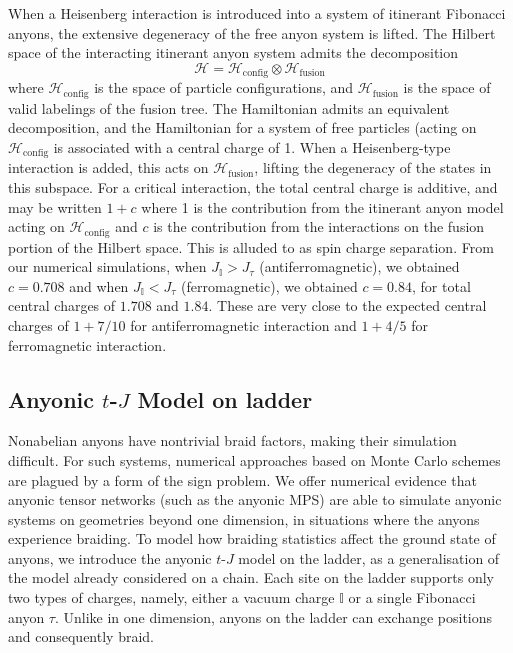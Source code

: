 \documentclass[aps,reprint,superscriptaddress,amsmath,amssymb,amsfonts,prb]{revtex4-1}
\newcommand{\mrm}[1]{\mathrm{#1}}
\newcommand{\mc}[1]{\mathcal{#1}}
\begin{document}
When a Heisenberg interaction is introduced into a system of itinerant Fibonacci anyons, the extensive degeneracy of the free anyon system is lifted. The Hilbert space of the interacting itinerant anyon system admits the decomposition
\begin{equation}
\mc{H} = \mc{H}_\mrm{config}\otimes\mc{H}_\mrm{fusion}
\end{equation}
where $\mc{H}_\mrm{config}$ is the space of particle configurations, and $\mc{H}_\mrm{fusion}$ is the space of valid labelings of the fusion tree. The Hamiltonian admits an equivalent decomposition, and the Hamiltonian for a system of free particles (acting on $\mc{H}_\mrm{config}$ is associated with 
a central charge of 1. When a Heisenberg-type interaction is added, this acts on $\mc{H}_\mrm{fusion}$, lifting the degeneracy of the states in this subspace. For a critical interaction, the total central charge is additive, and may be written $1+c$ where 1 is the contribution from the itinerant anyon model acting on $\mc{H}_\mrm{config}$ and $c$ is the contribution from the interactions on the fusion portion of the Hilbert space.\cite{Poilblanc2011a}
This is alluded to as spin charge separation. From our numerical simulations, when $J_\mathbb{I}>J_{\tau}$ (antiferromagnetic), we obtained $c = 0.708$ and when $J_\mathbb{I}<J_{\tau}$ (ferromagnetic), we obtained $c=0.84$, for total central charges of $1.708$ and $1.84$. These are very close to the expected central charges of $1+7/10$ for antiferromagnetic interaction and $1+4/5$ for ferromagnetic interaction.
 

\subsection{Anyonic $t$-$J$ Model on ladder}
Nonabelian anyons have nontrivial braid factors, making their simulation difficult. %
For such systems, numerical approaches based on Monte Carlo schemes are plagued by a form of the sign problem. We offer numerical evidence that anyonic tensor networks (such as the anyonic MPS) are able to simulate anyonic systems on geometries beyond one dimension, in situations where the anyons experience braiding. To model how braiding statistics affect the ground state of anyons, we introduce the anyonic $t$-$J$ model on the ladder, as a generalisation of the model already considered on a chain. Each site on the ladder supports only two types of charges, namely, either a vacuum charge $\mathbb{I}$ or a single Fibonacci anyon $\tau$. Unlike in one dimension, anyons on the ladder can exchange positions and consequently braid. 
\end{document}
